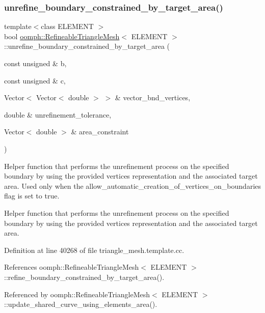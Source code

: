 \subsubsection{\texorpdfstring{unrefine\+\_\+boundary\+\_\+constrained\+\_\+by\+\_\+target\+\_\+area()}{unrefine\_boundary\_constrained\_by\_target\_area()}}
{\footnotesize\ttfamily template$<$class E\+L\+E\+M\+E\+NT $>$ \\
bool \hyperlink{classoomph_1_1RefineableTriangleMesh}{oomph\+::\+Refineable\+Triangle\+Mesh}$<$ E\+L\+E\+M\+E\+NT $>$\+::unrefine\+\_\+boundary\+\_\+constrained\+\_\+by\+\_\+target\+\_\+area (\begin{DoxyParamCaption}\item[{const unsigned \&}]{b,  }\item[{const unsigned \&}]{c,  }\item[{Vector$<$ Vector$<$ double $>$ $>$ \&}]{vector\+\_\+bnd\+\_\+vertices,  }\item[{double \&}]{unrefinement\+\_\+tolerance,  }\item[{Vector$<$ double $>$ \&}]{area\+\_\+constraint }\end{DoxyParamCaption})\hspace{0.3cm}{\ttfamily [protected]}}



Helper function that performs the unrefinement process on the specified boundary by using the provided vertices representation and the associated target area. Used only when the \textquotesingle{}allow\+\_\+automatic\+\_\+creation\+\_\+of\+\_\+vertices\+\_\+on\+\_\+boundaries\textquotesingle{} flag is set to true. 

Helper function that performs the unrefinement process on the specified boundary by using the provided vertices representation and the associated target area. 

Definition at line 40268 of file triangle\+\_\+mesh.\+template.\+cc.



References oomph\+::\+Refineable\+Triangle\+Mesh$<$ E\+L\+E\+M\+E\+N\+T $>$\+::refine\+\_\+boundary\+\_\+constrained\+\_\+by\+\_\+target\+\_\+area().



Referenced by oomph\+::\+Refineable\+Triangle\+Mesh$<$ E\+L\+E\+M\+E\+N\+T $>$\+::update\+\_\+shared\+\_\+curve\+\_\+using\+\_\+elements\+\_\+area().

\mbox{\label{classoomph_1_1RefineableTriangleMesh_a4631299a76f524bb6bed190836e26bcd}} 

